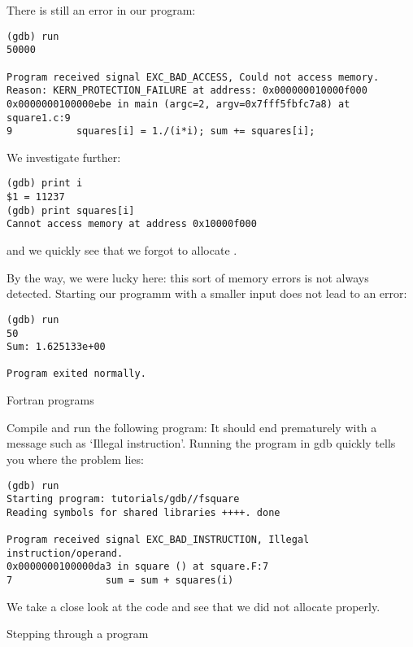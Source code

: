 There is still an error in our program:
\begin{verbatim}
(gdb) run
50000

Program received signal EXC_BAD_ACCESS, Could not access memory.
Reason: KERN_PROTECTION_FAILURE at address: 0x000000010000f000
0x0000000100000ebe in main (argc=2, argv=0x7fff5fbfc7a8) at square1.c:9
9           squares[i] = 1./(i*i); sum += squares[i];
\end{verbatim}
We investigate further:
\begin{verbatim}
(gdb) print i
$1 = 11237
(gdb) print squares[i]
Cannot access memory at address 0x10000f000
\end{verbatim}
and we quickly see that we forgot to allocate .

By the way, we were lucky here: this sort of memory errors is not always
detected. Starting our programm with a smaller input does not lead to
an error:
\begin{verbatim}
(gdb) run
50
Sum: 1.625133e+00

Program exited normally.
\end{verbatim}

 {Fortran programs}

Compile and run the following program:
It should end prematurely with a message such as `Illegal instruction'.
Running the program in gdb quickly tells you where the problem lies:
\begin{verbatim}
(gdb) run
Starting program: tutorials/gdb//fsquare 
Reading symbols for shared libraries ++++. done

Program received signal EXC_BAD_INSTRUCTION, Illegal instruction/operand.
0x0000000100000da3 in square () at square.F:7
7                sum = sum + squares(i)
\end{verbatim}
We take a close look at the code and see that we did not allocate
 properly.

 {Stepping through a program}

